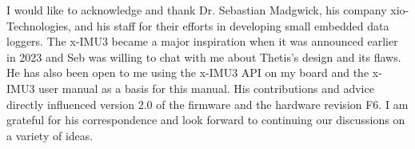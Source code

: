 
I would like to acknowledge and thank Dr. Sebastian Madgwick, his company xio-Technologies, and his staff for their efforts in developing small embedded data loggers.
The x-IMU3 became a major inspiration when it was announced earlier in 2023 and Seb was willing to chat with me about Thetis's design and its flaws.
He has also been open to me using the x-IMU3 API on my board and the x-IMU3 user manual as a basis for this manual.
His contributions and advice directly influenced version 2.0 of the firmware and the hardware revision F6.
I am grateful for his correspondence and look forward to continuing our discussions on a variety of ideas.